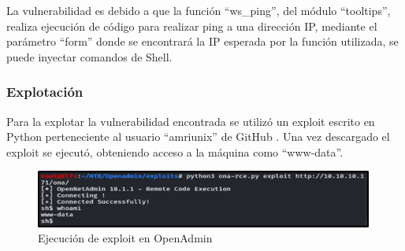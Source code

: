 La vulnerabilidad es debido a que la función “ws\_ping”, del módulo “tooltips”, realiza ejecución de código para realizar ping a una dirección IP, mediante el parámetro “form” donde se encontrará la IP esperada por la función utilizada, se puede inyectar comandos de Shell.
\subsubsection{Explotación}
Para la explotar la vulnerabilidad encontrada se utilizó un exploit escrito en Python perteneciente al usuario “amriunix” de GitHub \cite{ona}. Una vez descargado el exploit se ejecutó, obteniendo acceso a la máquina como “www-data”. 
\begin{figure}[H]
    \centering
    \includegraphics[width=0.99\textwidth]{imagenes/expopen.png}
    \caption{Ejecución de exploit en OpenAdmin}
\end{figure}
